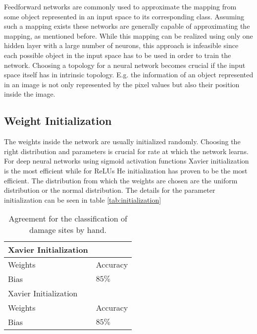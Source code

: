 Feedforward networks are commonly used to approximate the mapping from some object represented in an input space to its corresponding class. Assuming such a mapping exists these networks are generally capable of approximating the mapping, as mentioned before. While this mapping can be realized using only one hidden layer with a large number of neurons, this approach is infeasible since each possible object in the input space has to be used in order to train the network. Choosing a topology for a neural network becomes crucial if the input space itself has in intrinsic topology. E.g. the information of an object represented in an image is not only represented by the pixel values but also their position inside the image.\\

\subsection{Weight Initialization}
The weights inside the network are usually initialized randomly. Choosing the right distribution and parameters is crucial for rate at which the network learns. For deep neural networks using sigmoid activation functions Xavier initialization is the most efficient while for ReLUs He initialization has proven to be the most efficient. The distribution from which the weights are chosen are the uniform distribution or the normal distribution. The details for the parameter initialization can be seen in table \ref{tab:initialization}

\begin{table}[H]
 \begin{center}
  \begin{tabular}{@{} *2l @{}} \toprule[2pt]
   Xavier Initialization\\\midrule
   Weights & Accuracy \\
   Bias & $85 \%$   \\ 
   Xavier Initialization\\\midrule
   Weights & Accuracy \\
   Bias & $85 \%$   \\ 
  \end{tabular}
 \end{center}
 \caption{Agreement for the classification of damage sites by hand. }
 \label{tab:Reliability}
\end{table}


